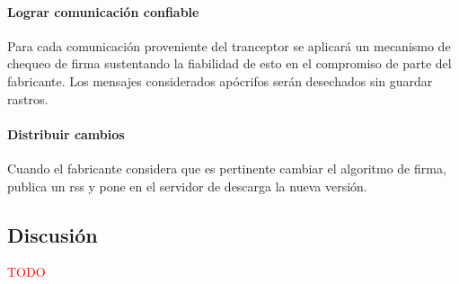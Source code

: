\paragraph{Lograr comunicación confiable}
Para cada comunicación proveniente del tranceptor se aplicará un mecanismo de chequeo de firma sustentando la fiabilidad de esto en el compromiso de parte del fabricante. Los mensajes considerados apócrifos serán desechados sin guardar rastros.
\paragraph{Distribuir cambios}
Cuando el fabricante considera que es pertinente cambiar el algoritmo de firma, publica un rss y pone en el servidor de descarga la nueva versión.

\subsection{Discusión}
\textcolor{red}{TODO}

